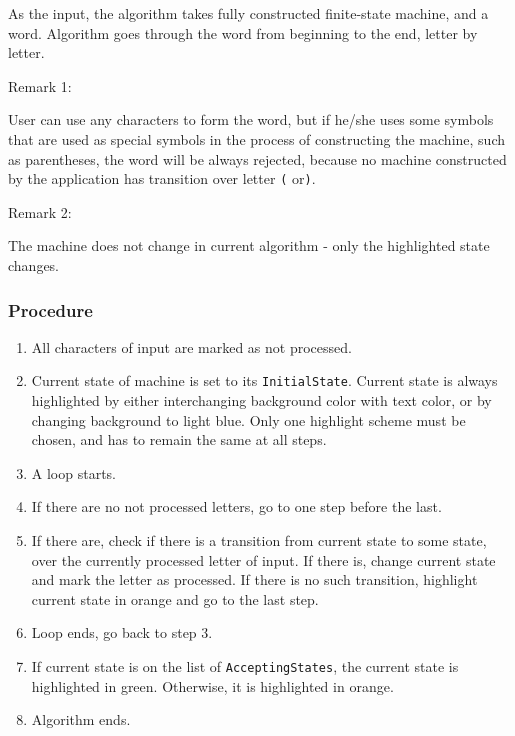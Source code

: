 \documentclass{article}
\begin{document}
As the input, the algorithm takes fully constructed finite-state machine, and a word. Algorithm goes
through the word from beginning to the end, letter by letter.

Remark 1:

User can use any characters to form the word, but if he/she uses some symbols that are used as
special symbols in the process of constructing the machine, such as parentheses, the word will be
always rejected, because no machine constructed by the application has transition over letter
\verb|(| or\verb|)|.

Remark 2:

The machine does not change in current algorithm - only the highlighted state changes.

\subsubsection{Procedure}

\begin{enumerate}

  \item All characters of input are marked as not processed.

  \item Current state of machine is set to its \verb|InitialState|. Current state is always
  highlighted by either interchanging background color with text color, or by changing background to
  light blue. Only one highlight scheme must be chosen, and has to remain the same at all steps.

  \item A loop starts.

  \item If there are no not processed letters, go to one step before the last. 

  \item If there are, check if there is a transition from current state to some state, over the
  currently processed letter of input. If there is, change current state and mark the letter as
  processed. If there is no such transition, highlight current state in orange and go to the last step.

  \item Loop ends, go back to step 3.

  \item If current state is on the list of \verb|AcceptingStates|, the current state is highlighted
  in green. Otherwise, it is highlighted in orange.

  \item Algorithm ends. 

\end{enumerate}
\end{document}
